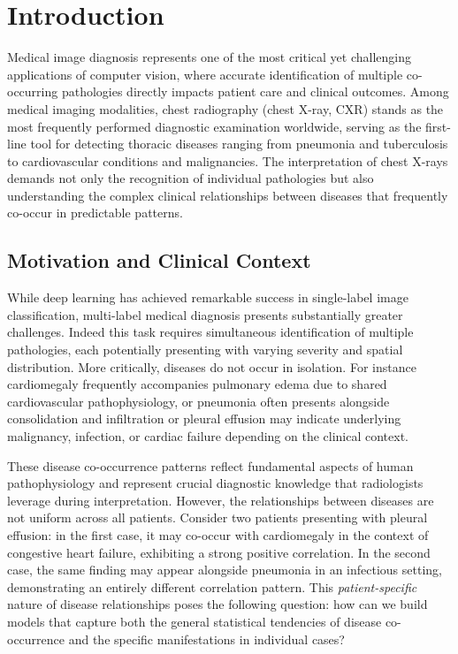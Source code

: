 \documentclass[
  journal=noname,
  manuscript=draft,
  year=,
  volume=,
]{cup-journal}
\begin{document}
\section{Introduction}
\label{sec:introduction}

Medical image diagnosis represents one of the most critical yet  challenging applications of computer vision, where accurate  identification of multiple co-occurring pathologies directly impacts  patient care and clinical outcomes. Among medical imaging modalities, chest radiography (chest X-ray, CXR) stands as the most frequently performed diagnostic examination worldwide\autocite{techspec}, serving as the first-line tool for detecting thoracic diseases ranging from pneumonia and tuberculosis to cardiovascular conditions and malignancies. The interpretation of chest X-rays demands not only the recognition of individual pathologies but also understanding the complex clinical relationships between diseases that frequently co-occur in predictable patterns.

\subsection{Motivation and Clinical Context}

While deep learning has achieved remarkable success in single-label image classification\autocite{he2015deepresiduallearningimage}, multi-label medical diagnosis presents substantially greater challenges. Indeed this task requires simultaneous identification of multiple pathologies, each potentially presenting with varying severity and spatial distribution. More critically, diseases do not occur in isolation. For instance cardiomegaly frequently accompanies pulmonary edema due to shared cardiovascular pathophysiology, or pneumonia often presents alongside consolidation and infiltration or pleural effusion may indicate underlying malignancy, infection, or cardiac failure depending on the clinical context.

These disease co-occurrence patterns reflect fundamental aspects of human pathophysiology and represent crucial diagnostic knowledge that radiologists leverage during interpretation. However, the relationships between diseases are not uniform across all patients. Consider two patients presenting with pleural effusion: in the first case, it may co-occur with cardiomegaly in the context of congestive heart failure, exhibiting a strong positive correlation. In the second case, the same finding may appear alongside pneumonia in an infectious setting, demonstrating an entirely different correlation pattern. This \textit{patient-specific} nature of disease relationships poses the following question: how can we build models that capture both the general statistical tendencies of disease co-occurrence and the specific manifestations in individual cases?
\end{document}
